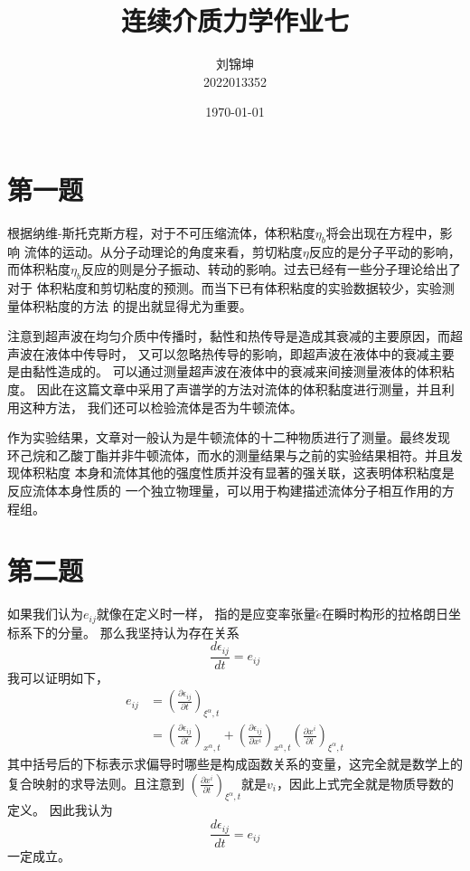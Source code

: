 \documentclass[UTF8]{ctexart}
\title{连续介质力学作业七}
\author{刘锦坤\\2022013352}
\date{\today}
\begin{document}
\maketitle

\section{第一题}

根据纳维-斯托克斯方程，对于不可压缩流体，体积粘度$\eta_b$将会出现在方程中，影响
流体的运动。从分子动理论的角度来看，剪切粘度$\eta$反应的是分子平动的影响，
而体积粘度$\eta_b$反应的则是分子振动、转动的影响。过去已经有一些分子理论给出了对于
体积粘度和剪切粘度的预测。而当下已有体积粘度的实验数据较少，实验测量体积粘度的方法
的提出就显得尤为重要。

注意到超声波在均匀介质中传播时，黏性和热传导是造成其衰减的主要原因，而超声波在液体中传导时，
又可以忽略热传导的影响，即超声波在液体中的衰减主要是由黏性造成的。
可以通过测量超声波在液体中的衰减来间接测量液体的体积粘度。
因此在这篇文章中采用了声谱学的方法对流体的体积黏度进行测量，并且利用这种方法，
我们还可以检验流体是否为牛顿流体。

作为实验结果，文章对一般认为是牛顿流体的十二种物质进行了测量。最终发现
环己烷和乙酸丁酯并非牛顿流体，而水的测量结果与之前的实验结果相符。并且发现体积粘度
本身和流体其他的强度性质并没有显著的强关联，这表明体积粘度是反应流体本身性质的
一个独立物理量，可以用于构建描述流体分子相互作用的方程组。

\section{第二题}
如果我们认为$e_{ij}$就像在定义时一样，
指的是应变率张量$\tilde e$在瞬时构形的拉格朗日坐标系下的分量。
那么我坚持认为存在关系
\begin{equation*}
    \frac{d \epsilon_{ij}}{dt}=e_{ij}  
\end{equation*}
我可以证明如下，
\begin{align*}
    e_{ij}&=(\frac{\partial \epsilon_{ij}}{\partial t})_{\xi^\alpha,t}\\
    &=(\frac{\partial \epsilon_{ij}}{\partial t})_{x^\alpha,t}
    +(\frac{\partial \epsilon_{ij}}{\partial x^i})_{x^\alpha,t}(\frac{\partial x^i}{\partial t})_{\xi^\alpha,t}
\end{align*}
其中括号后的下标表示求偏导时哪些是构成函数关系的变量，这完全就是数学上的复合映射的求导法则。且注意到
$(\frac{\partial x^i}{\partial t})_{\xi^\alpha,t}$就是$v_i$，因此上式完全就是物质导数的定义。
因此我认为
\begin{equation*}
    \frac{d \epsilon_{ij}}{dt}=e_{ij}  
\end{equation*}
一定成立。
\end{document}
